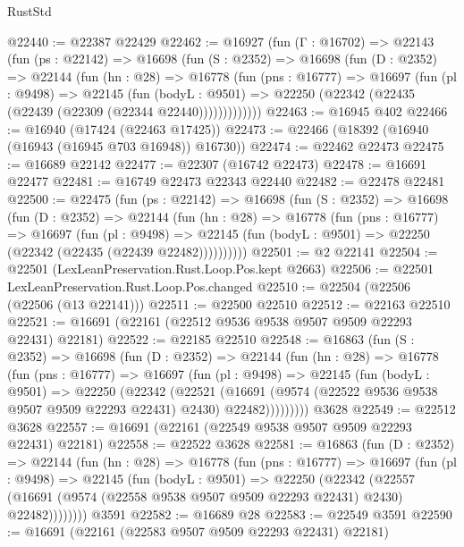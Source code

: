 \begin{lexlean}{RustStd}
\begin{coremodule}
@22440 := @22387 @22429
@22462 := @16927
    (fun (Γ : @16702) =>
    @22143
      (fun (ps : @22142) =>
      @16698
        (fun (S : @2352) =>
        @16698
          (fun (D : @2352) =>
          @22144
            (fun (hn : @28) =>
            @16778
              (fun (pns : @16777) =>
              @16697
                (fun (pl : @9498) =>
                @22145
                  (fun (bodyL : @9501) =>
                  @22250 (@22342 (@22435 (@22439 (@22309 (@22344 @22440)))))))))))))
@22463 := @16945 @402
@22466 := @16940 (@17424 (@22463 @17425))
@22473 := @22466 (@18392 (@16940 (@16943 (@16945 @703 @16948)) @16730))
@22474 := @22462 @22473
@22475 := @16689 @22142
@22477 := @22307 (@16742 @22473)
@22478 := @16691 @22477
@22481 := @16749 @22473 @22343 @22440
@22482 := @22478 @22481
@22500 := @22475
    (fun (ps : @22142) =>
    @16698
      (fun (S : @2352) =>
      @16698
        (fun (D : @2352) =>
        @22144
          (fun (hn : @28) =>
          @16778
            (fun (pns : @16777) =>
            @16697
              (fun (pl : @9498) =>
              @22145 (fun (bodyL : @9501) => @22250 (@22342 (@22435 (@22439 @22482))))))))))
@22501 := @2 @22141
@22504 := @22501 (LexLeanPreservation.Rust.Loop.Pos.kept @2663)
@22506 := @22501 LexLeanPreservation.Rust.Loop.Pos.changed
@22510 := @22504 (@22506 (@22506 (@13 @22141)))
@22511 := @22500 @22510
@22512 := @22163 @22510
@22521 := @16691 (@22161 (@22512 @9536 @9538 @9507 @9509 @22293 @22431) @22181)
@22522 := @22185 @22510
@22548 := @16863
    (fun (S : @2352) =>
    @16698
      (fun (D : @2352) =>
      @22144
        (fun (hn : @28) =>
        @16778
          (fun (pns : @16777) =>
          @16697
            (fun (pl : @9498) =>
            @22145
              (fun (bodyL : @9501) =>
              @22250
                (@22342
                  (@22521
                    (@16691
                      (@9574 (@22522 @9536 @9538 @9507 @9509 @22293 @22431) @2430)
                      @22482)))))))))
    @3628
@22549 := @22512 @3628
@22557 := @16691 (@22161 (@22549 @9538 @9507 @9509 @22293 @22431) @22181)
@22558 := @22522 @3628
@22581 := @16863
    (fun (D : @2352) =>
    @22144
      (fun (hn : @28) =>
      @16778
        (fun (pns : @16777) =>
        @16697
          (fun (pl : @9498) =>
          @22145
            (fun (bodyL : @9501) =>
            @22250
              (@22342
                (@22557
                  (@16691 (@9574 (@22558 @9538 @9507 @9509 @22293 @22431) @2430) @22482))))))))
    @3591
@22582 := @16689 @28
@22583 := @22549 @3591
@22590 := @16691 (@22161 (@22583 @9507 @9509 @22293 @22431) @22181)

\end{coremodule}
\end{lexlean}
